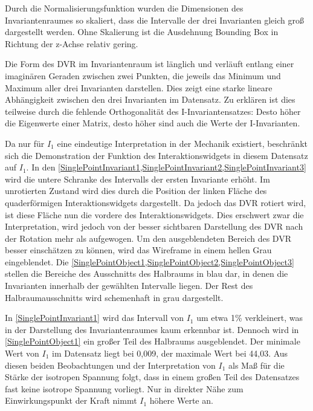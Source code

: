 \documentclass[a4paper,fontsize=12pt,toc=bib,parskip=half,ngerman]{scrartcl}
\begin{document}
Durch die Normalisierungsfunktion wurden die Dimensionen des Invariantenraumes so skaliert, dass die Intervalle der drei Invarianten gleich gro{\ss} dargestellt werden. Ohne Skalierung ist die Ausdehnung Bounding Box in Richtung der z-Achse relativ gering.

Die Form des DVR im Invariantenraum ist l\"anglich und verl\"auft entlang einer imagin\"aren Geraden zwischen zwei Punkten, die jeweils das Minimum und Maximum aller drei Invarianten darstellen. Dies zeigt eine starke lineare Abh\"angigkeit zwischen den drei Invarianten im Datensatz. Zu erkl\"aren ist dies teilweise durch die fehlende Orthogonalit\"at des I-Invariantensatzes: Desto h\"oher die Eigenwerte einer Matrix, desto h\"oher sind auch die Werte der I-Invarianten.  

Da nur f\"ur $I_1$ eine eindeutige Interpretation in der Mechanik existiert, beschr\"ankt sich die Demonstration der Funktion des Interaktionswidgets in diesem Datensatz auf $I_1$. In den \cref{SinglePointInvariant1,SinglePointInvariant2,SinglePointInvariant3} wird die untere Schranke des Intervalls der ersten Invariante erh\"oht. Im unrotierten Zustand wird dies durch die Position der linken Fl\"ache des quaderf\"ormigen Interaktionswidgets dargestellt. Da jedoch das DVR rotiert wird, ist diese Fl\"ache nun die vordere des Interaktionswidgets. Dies erschwert zwar die Interpretation, wird jedoch von der besser sichtbaren Darstellung des DVR nach der Rotation mehr als aufgewogen. Um den ausgeblendeten Bereich des DVR besser einsch\"atzen zu k\"onnen, wird das Wireframe in einem hellen Grau eingeblendet. Die \cref{SinglePointObject1,SinglePointObject2,SinglePointObject3} stellen die Bereiche des Ausschnitts des Halbraums in blau dar, in denen die Invarianten innerhalb der gew\"ahlten Intervalle liegen. Der Rest des Halbraumausschnitts wird schemenhaft in grau dargestellt.

In \cref{SinglePointInvariant1} wird das Intervall von $I_1$ um etwa 1\% verkleinert, was in der Darstellung des Invariantenraumes kaum erkennbar ist. Dennoch wird in \cref{SinglePointObject1} ein gro{\ss}er Teil des Halbraums ausgeblendet. Der minimale Wert von $I_1$ im Datensatz liegt bei 0,009, der maximale Wert bei 44,03. Aus diesen beiden Beobachtungen und der Interpretation von $I_1$ als Ma{\ss} f\"ur die St\"arke der isotropen Spannung folgt, dass in einem gro{\ss}en Teil des Datensatzes fast keine isotrope Spannung vorliegt. Nur in direkter N\"ahe zum Einwirkungspunkt der Kraft nimmt $I_1$ h\"ohere Werte an. 
\end{document}
